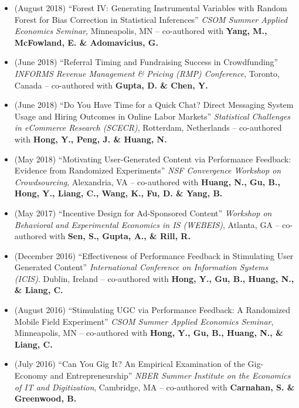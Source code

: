 \documentclass[10.5pt,letterpaper,sans]{moderncv}        %
\begin{document}
\begin{itemize}
\item (August 2018) ``Forest IV: Generating Instrumental Variables with Random Forest for Bias Correction in Statistical Inferences'' \textit{CSOM Summer Applied Economics Seminar}, Minneapolis, MN -- co-authored with \textbf{Yang, M., McFowland, E. \& Adomavicius, G.}

\item (June 2018) ``Referral Timing and Fundraising Success in Crowdfunding'' \textit{INFORMS Revenue Management \& Pricing (RMP) Conference}, Toronto, Canada -- co-authored with \textbf{Gupta, D. \& Chen, Y.}

\item (June 2018) ``Do You Have Time for a Quick Chat? Direct Messaging System Usage and Hiring Outcomes in Online Labor Markets'' \textit{Statistical Challenges in eCommerce Research (SCECR)}, Rotterdam, Netherlands -- co-authored with \textbf{Hong, Y., Peng, J. \& Huang, N.}

\item (May 2018) ``Motivating User-Generated Content via Performance Feedback: Evidence from Randomized Experiments'' \textit{NSF Convergence Workshop on Crowdsourcing}, Alexandria, VA -- co-authored with \textbf{Huang, N., Gu, B., Hong, Y., Liang, C., Wang, K., Fu, D. \& Yang, B.}

\item (May 2017) ``Incentive Design for Ad-Sponsored Content'' \textit{Workshop on Behavioral and Experimental Economics in IS (WEBEIS)}, Atlanta, GA -- co-authored with \textbf{Sen, S., Gupta, A., \& Rill, R.}

\item (December 2016) ``Effectiveness of Performance Feedback in Stimulating User Generated Content'' \textit{International Conference on Information Systems (ICIS)}. Dublin, Ireland -- co-authored with \textbf{Hong, Y., Gu, B., Huang, N., \& Liang, C.}

\item (August 2016) ``Stimulating UGC via Performance Feedback: A Randomized Mobile Field Experiment'' \textit{CSOM Summer Applied Economics Seminar}, Minneapolis, MN -- co-authored with \textbf{Hong, Y., Gu, B., Huang, N., \& Liang, C.}

\item (July 2016) ``Can You Gig It? An Empirical Examination of the Gig-Economy and Entrepreneurship'' \textit{NBER Summer Institute on the Economics of IT and Digitization}, Cambridge, MA -- co-authored with \textbf{Carnahan, S. \& Greenwood, B.}


\end{itemize}
\end{document}
